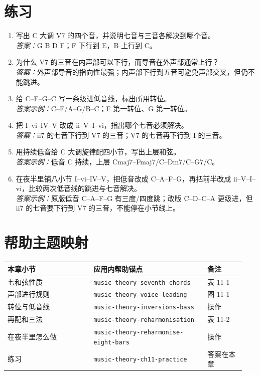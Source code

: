 \section{练习}

\begin{exercise}
\begin{enumerate}
  \item 写出 C 大调 V7 的四个音，并说明七音与三音各解决到哪个音。\\
  \emph{答案：}G B D F；F 下行到 E，B 上行到 C。
  \item 为什么 V7 的三音在内声部可以下行，而导音在外声部通常上行？\\
  \emph{答案：}外声部导音的指向性最强；内声部下行到五音可避免声部交叉，但仍不能跳进。
  \item 给 C--F--G--C 写一条级进低音线，标出所用转位。\\
  \emph{答案示例：}C--F/A--G/B--C；F 第一转位、G 第一转位。
  \item 把 I--vi--IV--V 改成 ii--V--I--vi，指出哪个七音必须解决。\\
  \emph{答案：}ii7 的七音下行到 V7 的三音；V7 的七音再下行到 I 的三音。
  \item 用持续低音给 C 大调旋律配四小节，写出上层和弦。\\
  \emph{答案示例：}低音 C 持续，上层 Cmaj7--Fmaj7/C--Dm7/C--G7/C。
  \item 在夜半里铺八小节 I--vi--IV--V，把低音改成 C--A--F--G，再把前半改成 ii--V--I--vi，比较两次低音线的跳进与七音解决。\\
  \emph{答案示例：}原版低音 C--A--F--G 有三度/四度跳；改版 C--D--C--A 更级进，但 ii7 的七音要下行到 V7 的三音，不能停在小节线上。
\end{enumerate}
\end{exercise}

\section{帮助主题映射}
\begin{center}
\footnotesize
\setlength{\tabcolsep}{3pt}
\begin{longtable}{p{0.34\linewidth}p{0.45\linewidth}p{0.15\linewidth}}
\toprule
本章小节 & 应用内帮助锚点 & 备注 \\
\midrule
\endhead
七和弦性质 & \texttt{music-theory-seventh-chords} & 表 11-1 \\
声部进行规则 & \texttt{music-theory-voice-leading} & 图 11-1 \\
转位与低音线 & \texttt{music-theory-inversions-bass} & 操作 \\
再配和三法 & \texttt{music-theory-reharmonisation} & 表 11-2 \\
在夜半里怎么做 & \texttt{music-theory-reharmonise-eight-bars} & 操作 \\
练习 & \texttt{music-theory-ch11-practice} & 答案在本章 \\
\bottomrule
\end{longtable}
\end{center}

